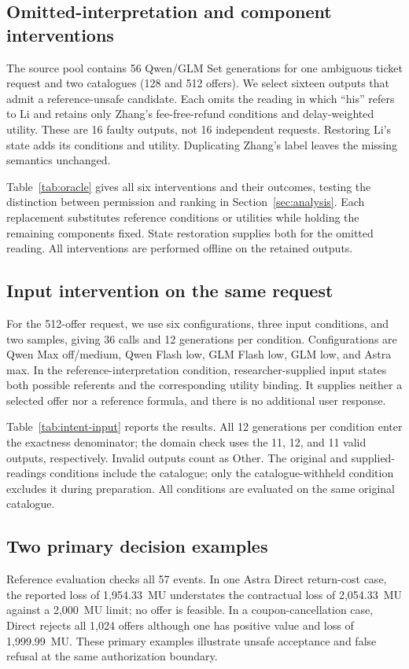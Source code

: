 \subsection{Omitted-interpretation and component interventions}
\label{app:oracle}
The source pool contains 56 Qwen/GLM Set generations for one ambiguous ticket request and two catalogues (128 and 512 offers). We select sixteen outputs that admit a reference-unsafe candidate. Each omits the reading in which ``his'' refers to Li and retains only Zhang's fee-free-refund conditions and delay-weighted utility. These are 16 faulty outputs, not 16 independent requests. Restoring Li's state adds its conditions and utility. Duplicating Zhang's label leaves the missing semantics unchanged.

Table~\ref{tab:oracle} gives all six interventions and their outcomes, testing the distinction between permission and ranking in Section~\ref{sec:analysis}. Each replacement substitutes reference conditions or utilities while holding the remaining components fixed. State restoration supplies both for the omitted reading. All interventions are performed offline on the retained outputs.

\subsection{Input intervention on the same request}
\label{app:intent-input}
For the 512-offer request, we use six configurations, three input conditions, and two samples, giving 36 calls and 12 generations per condition. Configurations are Qwen Max off/medium, Qwen Flash low, GLM Flash low, GLM low, and Astra max. In the reference-interpretation condition, researcher-supplied input states both possible referents and the corresponding utility binding. It supplies neither a selected offer nor a reference formula, and there is no additional user response.

Table~\ref{tab:intent-input} reports the results. All 12 generations per condition enter the exactness denominator; the domain check uses the 11, 12, and 11 valid outputs, respectively. Invalid outputs count as Other. The original and supplied-readings conditions include the catalogue; only the catalogue-withheld condition excludes it during preparation. All conditions are evaluated on the same original catalogue.

\subsection{Two primary decision examples}
\label{app:witnesses}
Reference evaluation checks all 57 events. In one Astra Direct return-cost case, the reported loss of 1,954.33~MU understates the contractual loss of 2,054.33~MU against a 2,000~MU limit; no offer is feasible. In a coupon-cancellation case, Direct rejects all 1,024 offers although one has positive value and loss of 1,999.99~MU. These primary examples illustrate unsafe acceptance and false refusal at the same authorization boundary.

